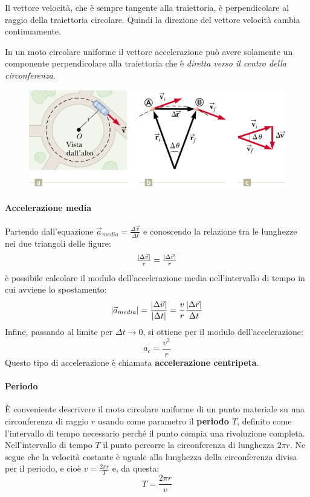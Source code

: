 \documentclass[12pt,oneside]{book}
\begin{document}
Il vettore velocità, che è sempre tangente alla traiettoria, è perpendicolare al raggio della traiettoria circolare. Quindi la direzione del vettore velocità cambia continuamente.

In un moto circolare uniforme il vettore accelerazione può avere solamente un componente perpendicolare alla traiettoria che è \emph{diretta verso il centro della circonferenza}.
\begin{figure}[h]
    \centering
    \includegraphics[scale=0.5]{moto_circolare_uniforme}    
\end{figure}

\paragraph{Accelerazione media}
Partendo dall'equazione $\vec{a}_{media} = \tfrac{\Delta \vec{v}}{\Delta t}$ e conoscendo la relazione tra le lunghezze nei due triangoli delle figure:
\begin{equation*}
    \tfrac{\abs{\Delta \vec{v}}}{v} = \tfrac{\abs{\Delta \vec{r}}}{r}
\end{equation*}
è possibile calcolare il modulo dell'accelerazione media nell'intervallo di tempo in cui avviene lo spostamento:
\begin{equation*}
    \abs{\vec{a}_{media}} = \frac{\abs{\Delta \vec{v}}}{\abs{\Delta t}} = \frac{v}{r}\frac{\abs{\Delta \vec{r}}}{\Delta t}
\end{equation*}
Infine, passando al limite per $\Delta t \to 0$, si ottiene per il modulo dell'accelerazione:
\begin{equation*}
    a_c = \frac{v^2}{r}
\end{equation*}
Questo tipo di accelerazione è chiamata \textbf{accelerazione centripeta}.

\paragraph{Periodo}
È conveniente descrivere il moto circolare uniforme di un punto materiale su una circonferenza di raggio $r$ usando come parametro il \textbf{periodo $T$}, 
definito come l’intervallo di tempo necessario perché il punto compia una rivoluzione completa. Nell’intervallo di tempo $T$ il punto percorre la circonferenza 
di lunghezza $2\pi r$. Ne segue che la velocità costante è uguale alla lunghezza della circonferenza divisa per il periodo, e cioè $v = \tfrac{2\pi r}{T}$ e, da questa:
\begin{equation*}
    T = \frac{2\pi r}{v}
\end{equation*}
\end{document}
